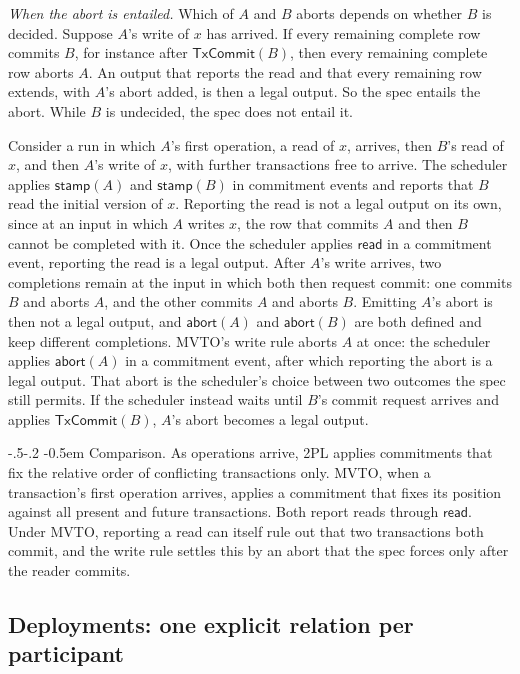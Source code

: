 \documentclass[sigconf]{cidr-2027}
\makeatletter
\theoremstyle{remark}
\renewcommand\paragraph{\@startsection{paragraph}{4}{\z@}%
  {-.5\baselineskip \@plus -2\p@ \@minus -.2\p@}%
  {-0.5em}%
  {\normalfont\bfseries}}
\newcommand{\commitment}{commitment\xspace}
\newcommand{\commitments}{commitments\xspace}
\newcommand{\outrel}{extends\xspace}          %
\makeatother
\begin{document}
\emph{When the abort is entailed.}  Which of $A$ and $B$ aborts depends on
whether $B$ is decided. Suppose $A$'s write of $x$ has arrived. If every
remaining complete row commits $B$, for instance after $\mathsf{TxCommit}(B)$,
then every remaining complete row aborts $A$. An output that reports the read
and that every remaining row \outrel, with $A$'s abort added, is then a legal
output. So the spec entails the abort. While $B$ is undecided, the spec does
not entail it.

Consider a run in which $A$'s first operation, a read of $x$, arrives, then
$B$'s read of $x$, and then $A$'s write of $x$, with further transactions free
to arrive. The scheduler applies $\mathsf{stamp}(A)$ and $\mathsf{stamp}(B)$
in \commitment events and reports that $B$ read the initial version of $x$. Reporting the read is not a legal output on its own, since at an input in
which $A$ writes $x$, the row that commits $A$ and then $B$ cannot be
completed with it. Once the scheduler applies $\mathsf{read}$ in a
\commitment event, reporting the read is a legal output. After $A$'s write
arrives, two completions remain at the input in which both then request
commit: one commits $B$ and aborts $A$, and the other commits $A$ and aborts
$B$. Emitting $A$'s abort is then not a legal output, and
$\mathsf{abort}(A)$ and $\mathsf{abort}(B)$ are both defined and keep
different completions. MVTO's write rule aborts $A$ at once: the scheduler
applies $\mathsf{abort}(A)$ in a \commitment event, after which reporting the
abort is a legal output. That abort is the scheduler's choice between two
outcomes the spec still permits. If the scheduler instead waits until $B$'s
commit request arrives and applies $\mathsf{TxCommit}(B)$, $A$'s abort becomes
a legal output.

\paragraph{Comparison.}
As operations arrive, 2PL applies \commitments that fix the relative order of
conflicting transactions only. MVTO, when a transaction's first operation
arrives, applies a \commitment that fixes its position against all present and
future transactions. Both report reads through $\mathsf{read}$. Under MVTO,
reporting a read can itself rule out that two transactions both commit, and
the write rule settles this by an abort that the spec forces only after the
reader commits.

\subsection{Deployments: one explicit relation per participant}
\label{app:deployment}
\end{document}
